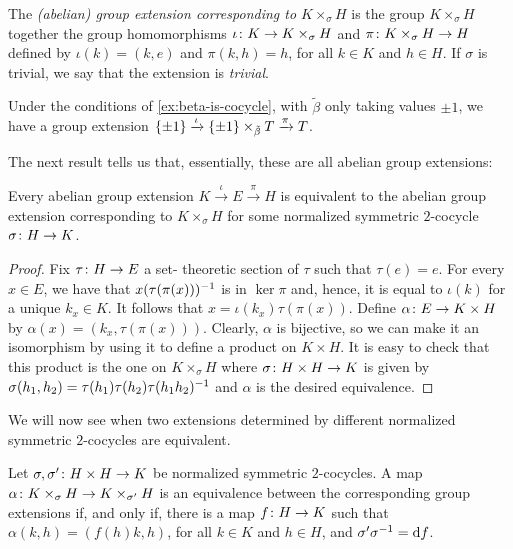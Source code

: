 \begin{defi}
	The \emph{(abelian) group extension corresponding to $K \times_\sigma H$} is the group $K \times_\sigma H$ together the group homomorphisms $\iota \colon K \to K \times_\sigma H$ and $\pi \colon K \times_\sigma H \to H$ defined by $\iota (k) = (k , e)$ and $\pi (k, h) = h$, for all $k\in K$ and $h\in H$.
	If $\sigma$ is trivial, we say that the extension is \emph{trivial}.
\end{defi}

\begin{ex}\label{ex:pmone-x-tilde-beta-T}
    Under the conditions of \cref{ex:beta-is-cocycle}, with $\tilde\beta$ only taking values $\pm 1$, we have a group extension $\{ \pm 1 \} \xrightarrow{\iota} \{ \pm 1 \} \times_{\tilde\beta} T \xrightarrow{\pi} T$. 
\end{ex}

The next result tells us that, essentially, these are all abelian group extensions:

\begin{prop}\label{prop:all-ext-are-cocycle}
	Every abelian group extension $K \xrightarrow{\iota} E \xrightarrow{\pi} H$ is equivalent to the abelian group extension corresponding to $K\times_\sigma H$ for some normalized symmetric $2$-cocycle $\sigma\colon H \to K$.
\end{prop}

\begin{proof}
	Fix $\tau\colon H \to E$ a set- theoretic section of $\tau$ such that $\tau(e) = e$.
	For every $x \in E$, we have that $x (\tau(\pi(x)))^{-1}$ is in $\ker \pi$ and, hence, it is equal to $\iota(k)$ for a unique $k_x\in K$.
	It follows that $x = \iota(k_x) \tau(\pi(x))$.
	Define $\alpha\colon E \to K\times H$ by $\alpha(x) = (k_x, \tau(\pi(x)) )$.
	Clearly, $\alpha$ is bijective, so we can make it an isomorphism by using it to define a product on $K\times H$.
	It is easy to check that this product is the one on $K \times_\sigma H$ where $\sigma\colon H\times H \to K$ is given by $\sigma(h_1, h_2) = \tau(h_1) \tau(h_2) \tau(h_1 h_2)^{-1}$ and $\alpha$ is the desired equivalence.
\end{proof}

We will now see when two extensions determined by different normalized symmetric $2$-cocycles are equivalent. 

\begin{prop}\label{prop:coboundary}
	Let $\sigma, \sigma' \colon H\times H \to K$ be normalized symmetric $2$-cocycles.
	A map $\alpha\colon K \times_{\sigma} H \to K \times_{\sigma'} H$ is an equivalence between the corresponding group extensions if, and only if, there is a map $f\colon H \to K$ such that $\alpha(k,h) = (f(h) k, h)$, for all $k\in K$ and $h\in H$, and $\sigma' \sigma^{-1} = \mathrm{d} f$.
\end{prop}

